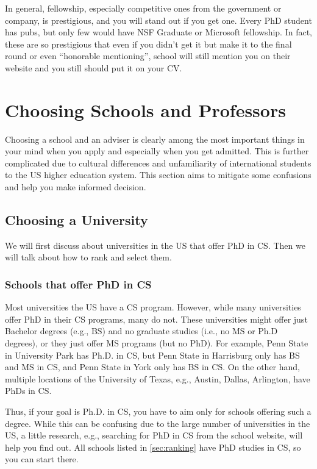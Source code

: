 \documentclass[oneside,11pt]{memoir}
\begin{document}
In general, fellowship, especially competitive ones from the government or company, is prestigious, and you will stand out if you get one.  Every PhD student has pubs, but only few  would have NSF Graduate or Microsoft fellowship. In fact, these are so prestigious that even if you didn't get it but make it to the final round or even ``honorable mentioning'', school will still mention you on their website and you still should put it on your CV.


\chapter{Choosing Schools and Professors}\label{sec:schoolsandprofs}

Choosing a school and an adviser is clearly among the most important things in your mind when you apply and especially when you get admitted.  This is further complicated due to cultural differences and unfamiliarity of  international students to the US higher education system.  This section aims to mitigate some confusions and help you make informed decision.

\section{Choosing a University}

We will first discuss about universities in the US that offer PhD in CS. Then we will talk about how to rank and select them.

\subsection{Schools that offer PhD in CS}  

Most universities the US have a CS program.
However, while many universities offer PhD in their CS programs, many do not.  These universities might offer just Bachelor degrees (e.g., BS) and no graduate studies (i.e., no MS or Ph.D degrees), or they just offer MS programs (but no PhD). For example, Penn State in University Park has Ph.D. in CS,  but Penn State in Harrisburg only has BS and MS in CS, and Penn State in York only has BS in CS.  On the other hand, multiple locations of the University of Texas, e.g., Austin, Dallas, Arlington, have PhDs in CS. 

Thus, if your goal is Ph.D. in CS, you have to aim only for schools offering such a degree.  %
While this can be confusing due to the large number of universities in the US, a little research, e.g., searching for PhD in CS from the school website, will help you find out. All schools listed in \autoref{sec:ranking} have PhD studies in CS, so you can start there.
\end{document}
